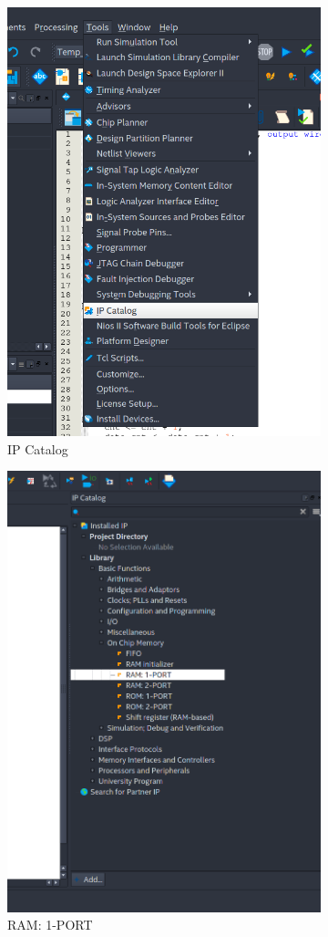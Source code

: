 \documentclass[letter,12pt]{article}
\begin{document}
\begin{figure}[h!]
  \centering
  \begin{subfigure}[b]{0.4\linewidth}
    \centering
    \includegraphics[width=0.75\linewidth]{pics/IPCatalog.png}
    \caption{IP Catalog}
  \end{subfigure}
  \begin{subfigure}[b]{0.4\linewidth}
    \centering
    \includegraphics[width=0.75\linewidth]{pics/RAM1Port.png}
    \caption{RAM: 1-PORT}
  \end{subfigure}
  \caption{}
\end{figure}
\end{document}
